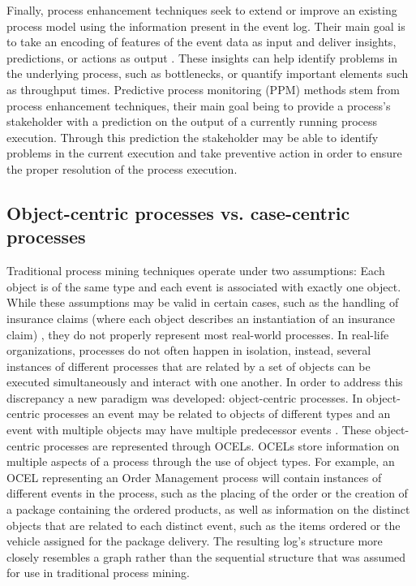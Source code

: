     Finally, process enhancement techniques seek to extend or improve an existing process model using the information present in the event log. Their main goal is to take an encoding of features of the event data as input and deliver insights, predictions, or actions as output \cite{adams2022}. These insights can help identify problems in the underlying process, such as bottlenecks, or quantify important elements such as throughput times. Predictive process monitoring (PPM) methods stem from process enhancement techniques, their main goal being to provide a process's stakeholder with a prediction on the output of a currently running process execution. Through this prediction the stakeholder may be able to identify problems in the current execution and take preventive action in order to ensure the proper resolution of the process execution.

    \subsection{Object-centric processes vs. case-centric processes}
        Traditional process mining techniques operate under two assumptions: Each object is of the same type and each event is associated with exactly one object. While these assumptions may be valid in certain cases, such as the handling of insurance claims (where each object describes an instantiation of an insurance claim) \cite{adams2022}, they do not properly represent most real-world processes. In real-life organizations, processes do not often happen in isolation, instead, several instances of different processes that are related by a set of objects can be executed simultaneously and interact with one another. In order to address this discrepancy a new paradigm was developed: object-centric processes. In object-centric processes an event may be related to objects of different types and an event with multiple objects may have multiple predecessor events \cite{gherissi2023}. These object-centric processes are represented through OCELs. OCELs store information on multiple aspects of a process through the use of object types. For example, an OCEL representing an Order Management process will contain instances of different events in the process, such as the placing of the order or the creation of a package containing the ordered products, as well as information on the distinct objects that are related to each distinct event, such as the items ordered or the vehicle assigned for the package delivery. The resulting log's structure more closely resembles a graph rather than the sequential structure that was assumed for use in traditional process mining.

